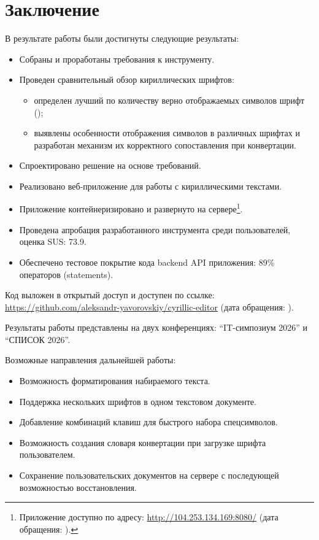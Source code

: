 
\section*{Заключение}
В результате работы были достигнуты следующие результаты:
\begin{itemize}
    \item Собраны и проработаны требования к инструменту.
    \item Проведен сравнительный обзор кириллических шрифтов:
    \begin{itemize}
        \item определен лучший по количеству верно отображаемых символов шрифт (\menaionunicodefont{});
        \item выявлены особенности отображения символов в различных шрифтах и разработан механизм их корректного сопоставления при конвертации.
    \end{itemize}
    \item Спроектировано решение на основе требований.
    \item Реализовано веб-приложение для работы с кириллическими текстами.
    \item Приложение контейнеризировано и развернуто на сервере\footnote{Приложение доступно по адресу: \url{http://104.253.134.169:8080/} (дата обращения: ).}.
    \item Проведена апробация разработанного инструмента среди пользователей, оценка SUS: 73.9.
    \item Обеспечено тестовое покрытие кода backend API приложения: 89\% операторов (statements).
\end{itemize}

Код выложен в открытый доступ и доступен по ссылке: \url{https://github.com/aleksandr-yavorovskiy/cyrillic-editor} (дата обращения: ).

Результаты работы представлены на двух конференциях: \enquote{IT-симпозиум 2026} и \enquote{СПИСОК 2026}.


Возможные направления дальнейшей работы:
\begin{itemize}
    \item Возможность форматирования набираемого текста.
    \item Поддержка нескольких шрифтов в одном текстовом документе.
    \item Добавление комбинаций клавиш для быстрого набора спецсимволов.
    \item Возможность создания словаря конвертации при загрузке шрифта пользователем.
    \item Сохранение пользовательских документов на сервере с последующей возможностью восстановления.
\end{itemize}
